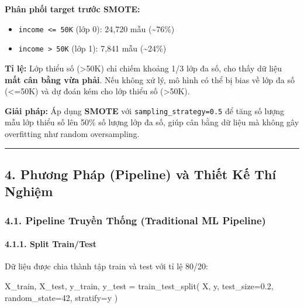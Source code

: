 \documentclass[
]{article}
\newenvironment{Shaded}{}{}
\newcommand{\DecValTok}[1]{\textcolor[rgb]{0.25,0.63,0.44}{#1}}
\newcommand{\FloatTok}[1]{\textcolor[rgb]{0.25,0.63,0.44}{#1}}
\newcommand{\NormalTok}[1]{#1}
\newcommand{\OperatorTok}[1]{\textcolor[rgb]{0.40,0.40,0.40}{#1}}
\providecommand{\tightlist}{%
  \setlength{\itemsep}{0pt}\setlength{\parskip}{0pt}}
\begin{document}
\textbf{Phân phối target trước SMOTE:}

\begin{itemize}
\tightlist
\item
  \texttt{income\ \textless{}=\ 50K} (lớp 0): 24,720 mẫu
  (\textasciitilde76\%)
\item
  \texttt{income\ \textgreater{}\ 50K} (lớp 1): 7,841 mẫu
  (\textasciitilde24\%)
\end{itemize}

\textbf{Tỉ lệ:} Lớp thiểu số (\textgreater50K) chỉ chiếm khoảng 1/3 lớp
đa số, cho thấy dữ liệu \textbf{mất cân bằng vừa phải}. Nếu không xử lý,
mô hình có thể bị bias về lớp đa số (\textless=50K) và dự đoán kém cho
lớp thiểu số (\textgreater50K).

\textbf{Giải pháp:} Áp dụng \textbf{SMOTE} với
\texttt{sampling\_strategy=0.5} để tăng số lượng mẫu lớp thiểu số lên
50\% số lượng lớp đa số, giúp cân bằng dữ liệu mà không gây overfitting
như random oversampling.

\begin{center}\rule{0.5\linewidth}{0.5pt}\end{center}

\subsection{4. Phương Pháp (Pipeline) và Thiết Kế Thí
Nghiệm}\label{4-phux1b0ux1a1ng-phuxe1p-pipeline-vuxe0-thiux1ebft-kux1ebf-thuxed-nghiux1ec7m}

\subsubsection{4.1. Pipeline Truyền Thống (Traditional ML
Pipeline)}\label{41-pipeline-truyux1ec1n-thux1ed1ng-traditional-ml-pipeline}

\paragraph{4.1.1. Split Train/Test}\label{411-split-traintest}

Dữ liệu được chia thành tập train và test với tỉ lệ 80/20:

\begin{Shaded}
\begin{Highlighting}[]
\NormalTok{X\_train, X\_test, y\_train, y\_test }\OperatorTok{=}\NormalTok{ train\_test\_split(}
\NormalTok{    X, y, test\_size}\OperatorTok{=}\FloatTok{0.2}\NormalTok{, random\_state}\OperatorTok{=}\DecValTok{42}\NormalTok{, stratify}\OperatorTok{=}\NormalTok{y}
\NormalTok{)}
\end{Highlighting}
\end{Shaded}
\end{document}
